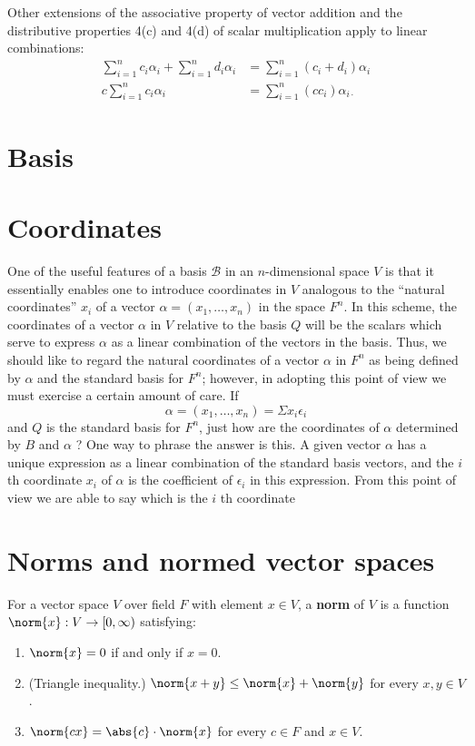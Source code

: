 \documentclass[main.tex]{subfiles}
\begin{document}
Other extensions of the associative property of vector addition and the distributive properties 4(c) and 4(d) of scalar multiplication apply to linear combinations:
$$
\begin{aligned}
\sum_{i=1}^n c_i \alpha_i+\sum_{i=1}^n d_i \alpha_i & =\sum_{i=1}^n\left(c_i+d_i\right) \alpha_i \\
c \sum_{i=1}^n c_i \alpha_i & =\sum_{i=1}^n\left(c c_i\right) \alpha_{i \cdot}
\end{aligned}
$$
\section{Basis}


\section{Coordinates}
One of the useful features of a basis $\mathcal{B}$ in an $n$-dimensional space $V$ is that it essentially enables one to introduce coordinates in $V$ analogous to the ``natural coordinates'' $x_i$ of a vector $\alpha=\left(x_1, \ldots, x_n\right)$ in the space $F^n$. In this scheme, the coordinates of a vector $\alpha$ in $V$ relative to the basis $Q$ will be the scalars which serve to express $\alpha$ as a linear combination of the vectors in the basis. Thus, we should like to regard the natural coordinates of a vector $\alpha$ in $F^n$ as being defined by $\alpha$ and the standard basis for $F^n$; however, in adopting this point of view we must exercise a certain amount of care. If
$$
\alpha=\left(x_1, \ldots, x_n\right)=\Sigma x_i \epsilon_i
$$
and $Q$ is the standard basis for $F^n$, just how are the coordinates of $\alpha$ determined by $B$ and $\alpha$ ? One way to phrase the answer is this. A given vector $\alpha$ has a unique expression as a linear combination of the standard basis vectors, and the $i$ th coordinate $x_i$ of $\alpha$ is the coefficient of $\epsilon_i$ in this expression. From this point of view we are able to say which is the $i$ th coordinate

\section{Norms and normed vector spaces}

\begin{definition}
For a vector space $V$ over field $F$ with element $x \in V$, a \textbf{norm} of $V$ is a function $\norm{x}: V \rightarrow [0,\infty)$ satisfying: 
\begin{enumerate}
    \item $\norm{x} = 0$ if and only if $x = 0$.
    \item (Triangle inequality.) $\norm{x + y} \leq \norm{x} + \norm{y}$ for every $x, y \in V$. 
    \item $\norm{cx} = \abs{c} \cdot \norm{x}$ for every $c \in F$ and $x \in V$. 
\end{enumerate}
\end{definition}
\end{document}
